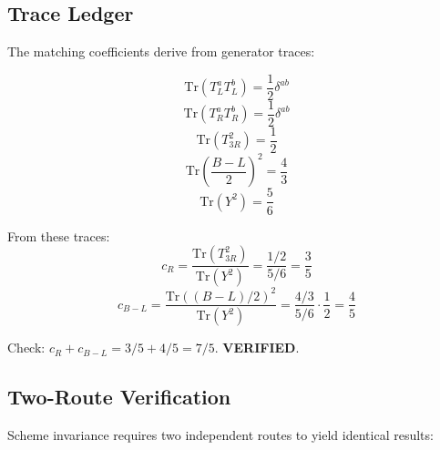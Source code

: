 \documentclass[11pt,a4paper]{article}
\begin{document}
\subsection{Trace Ledger}
\label{subsec:trace-ledger}

The matching coefficients derive from generator traces:

\begin{equation}
\label{eq:trace-TL}
\text{Tr}(T_L^a T_L^b) = \frac{1}{2}\delta^{ab}
\end{equation}
\begin{equation}
\label{eq:trace-TR}
\text{Tr}(T_R^a T_R^b) = \frac{1}{2}\delta^{ab}
\end{equation}
\begin{equation}
\label{eq:trace-T3R}
\text{Tr}(T_{3R}^2) = \frac{1}{2}
\end{equation}
\begin{equation}
\label{eq:trace-BL}
\text{Tr}\left(\frac{B-L}{2}\right)^2 = \frac{4}{3}
\end{equation}
\begin{equation}
\label{eq:trace-Y}
\text{Tr}(Y^2) = \frac{5}{6}
\end{equation}

From these traces:
\begin{equation}
\label{eq:cR-derivation}
c_R = \frac{\text{Tr}(T_{3R}^2)}{\text{Tr}(Y^2)} = \frac{1/2}{5/6} = \frac{3}{5}
\end{equation}
\begin{equation}
\label{eq:cBL-derivation}
c_{B-L} = \frac{\text{Tr}((B-L)/2)^2}{\text{Tr}(Y^2)} = \frac{4/3}{5/6} \cdot \frac{1}{2} = \frac{4}{5}
\end{equation}

\begin{trapbox}
\label{trap:rt05}
Check: $c_R + c_{B-L} = 3/5 + 4/5 = 7/5$. \textbf{VERIFIED}.
\end{trapbox}

\subsection{Two-Route Verification}
\label{subsec:two-route}

Scheme invariance requires two independent routes to yield identical results:
\end{document}
